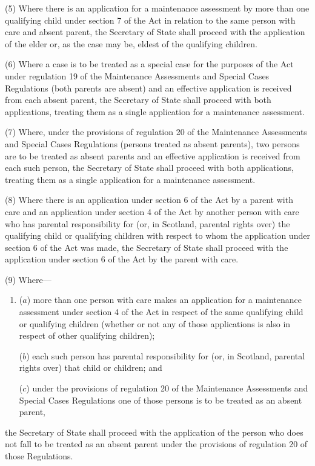\documentclass[a4paper,12pt]{article}
\begin{document}
(5) Where there is an application for a maintenance assessment by more than one qualifying child under section 7 of the Act in relation to the same person with care and absent parent, 
the Secretary of State  %
shall proceed with the application of the elder or, as the case may be, eldest of the qualifying children.

(6) Where a case is to be treated as a special case for the purposes of the Act under regulation 19 of the Maintenance Assessments and Special Cases Regulations (both parents are absent) and an effective application is received from each absent parent, 
the Secretary of State  %
shall proceed with both applications, treating them as a single application for a maintenance assessment.

(7) Where, under the provisions of regulation 20 of the Maintenance Assessments and Special Cases Regulations (persons treated as absent parents), two persons are to be treated as absent parents and an effective application is received from each such person, 
the Secretary of State  %
shall proceed with both applications, treating them as a single application for a maintenance assessment.

(8) Where there is an application under section 6 of the Act by a parent with care and an application under section 4 of the Act by another person with care who has parental responsibility for (or, in Scotland, parental rights over) the qualifying child or qualifying children with respect to whom the application under section 6 of the Act was made, 
the Secretary of State  %
shall proceed with the application under section 6 of the Act by the parent with care.

(9) Where—
\begin{enumerate}\item[]
($a$) more than one person with care makes an application for a maintenance assessment under section 4 of the Act in respect of the same qualifying child or qualifying children (whether or not any of those applications is also in respect of other qualifying children);

\begin{sloppypar}
($b$) each such person has parental responsibility for (or, in Scotland, parental rights over) that child or children; and
\end{sloppypar}

($c$) under the provisions of regulation 20 of the Maintenance Assessments and Special Cases Regulations one of those persons is to be treated as an absent parent,
\end{enumerate}
the Secretary of State  %
shall proceed with the application of the person who does not fall to be treated as an absent parent under the provisions of regulation 20 of those Regulations.
\end{document}
